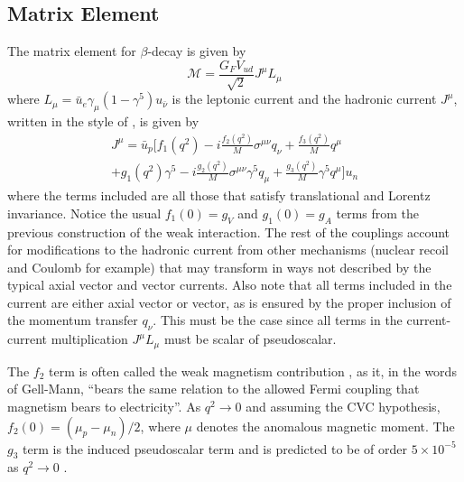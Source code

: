 \subsection{Matrix Element}
The matrix element for $\beta$-decay is given by
%
\begin{equation}
  \mathcal{M} = \frac{G_FV_{ud}}{\sqrt{2}} J^\mu L_\mu
  \label{eq:M}
\end{equation}
%
where $L_\mu = \bar{u}_e \gamma_\mu (1-\gamma^5) u_{\bar{\nu}}$ is the leptonic current
and the hadronic current $J^\mu$, written in the style of \cite{gardner2001}, is given by
%
\begin{multline}
  J^\mu = \bar{u}_p \bigg[ f_1(q^2) - i \frac{f_{2}(q^2)}{M}\sigma^{\mu\nu}q_\nu + \frac{f_3(q^2)}{M}q^\mu \\
    + g_1(q^2)\gamma^5 - i \frac{g_{2}(q^2)}{M}\sigma^{\mu\nu}\gamma^5q_\mu 
    +  \frac{g_3(q^2)}{M}\gamma^5q^\mu \bigg] u_n
\end{multline}
%
where the terms included are all those that satisfy translational and Lorentz invariance. Notice the
usual $f_1(0)=g_V$ and $g_1(0) = g_A$ terms from the previous construction of the weak interaction. The
rest of the couplings
account for modifications to the hadronic current from other mechanisms (nuclear recoil and Coulomb for example)
that may transform in ways not described by the typical axial vector and vector currents. Also note that all terms
included in the current are either axial vector or vector, as is ensured by the proper inclusion of the momentum
transfer $q_\nu$. This must be the case since all terms in the current-current multiplication $J^\mu L_\mu$ must be
scalar of pseudoscalar.

The $f_2$ term is often called the weak magnetism contribution \cite{gellmann1958}, as it, in
the words of Gell-Mann,
``bears the same relation to the allowed Fermi coupling that magnetism bears to electricity''.
As $q^2\rightarrow0$ and assuming the CVC hypothesis,
$f_2(0) = (\mu_p - \mu_n)/2$, where $\mu$ denotes the anomalous magnetic moment.
The $g_3$ term is the induced pseudoscalar term and is predicted to be of order $5\times 10^{-5}$ as
$q^2\rightarrow0$ \cite{holstein1974recoil}.

